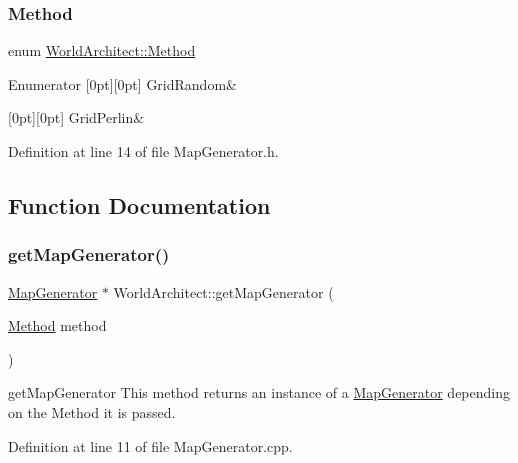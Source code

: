 \subsubsection{\texorpdfstring{Method}{Method}}
{\footnotesize\ttfamily enum \mbox{\hyperlink{namespace_world_architect_a9bb4333e2d555bf42bf7d14ec2a2ae7b}{World\+Architect\+::\+Method}}}

\begin{DoxyEnumFields}{Enumerator}
[0pt][0pt]{}\mbox{\label{namespace_world_architect_a9bb4333e2d555bf42bf7d14ec2a2ae7ba73e5bbdae306a94e7fa95e797dfeb5dd}} 
Grid\+Random&\\
\hline

[0pt][0pt]{}\mbox{\label{namespace_world_architect_a9bb4333e2d555bf42bf7d14ec2a2ae7ba023523cc51ab3633fe50997121f93a44}} 
Grid\+Perlin&\\
\hline

\end{DoxyEnumFields}


Definition at line 14 of file Map\+Generator.\+h.



\subsection{Function Documentation}
\mbox{\label{namespace_world_architect_a984fb538abd7ab5b38bbce0a7bfae707}} 
\subsubsection{\texorpdfstring{getMapGenerator()}{getMapGenerator()}}
{\footnotesize\ttfamily \mbox{\hyperlink{class_world_architect_1_1_map_generator}{Map\+Generator}} $\ast$ World\+Architect\+::get\+Map\+Generator (\begin{DoxyParamCaption}\item[{\mbox{\hyperlink{namespace_world_architect_a9bb4333e2d555bf42bf7d14ec2a2ae7b}{Method}}}]{method }\end{DoxyParamCaption})}

get\+Map\+Generator This method returns an instance of a \mbox{\hyperlink{class_world_architect_1_1_map_generator}{Map\+Generator}} depending on the Method it is passed. 

Definition at line 11 of file Map\+Generator.\+cpp.

